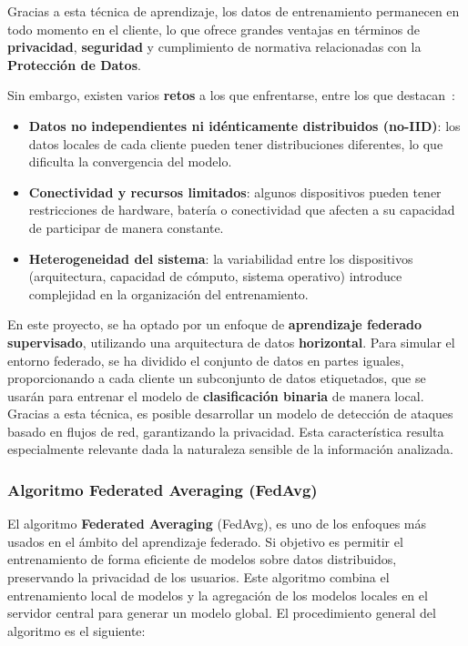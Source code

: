 
Gracias a esta técnica de aprendizaje, los datos de entrenamiento permanecen en todo momento en el cliente, lo que ofrece grandes ventajas en términos de \textbf{privacidad}, \textbf{seguridad} y cumplimiento de normativa relacionadas con la \textbf{Protección de Datos}.

Sin embargo, existen varios \textbf{retos} a los que enfrentarse, entre los que destacan~\cite{aprendizaje_federado_articulo}:

\begin{itemize}
    \item \textbf{Datos no independientes ni idénticamente distribuidos (no-IID)}: los datos locales de cada cliente pueden tener distribuciones diferentes, lo que dificulta la convergencia del modelo.
    
    \item \textbf{Conectividad y recursos limitados}: algunos dispositivos pueden tener restricciones de hardware, batería o conectividad que afecten a su capacidad de participar de manera constante.
    
    \item \textbf{Heterogeneidad del sistema}: la variabilidad entre los dispositivos (arquitectura, capacidad de cómputo, sistema operativo) introduce complejidad en la organización del entrenamiento.
\end{itemize}

En este proyecto, se ha optado por un enfoque de \textbf{aprendizaje federado supervisado}, utilizando una arquitectura de datos \textbf{horizontal}. Para simular el entorno federado, se ha dividido el conjunto de datos en partes iguales, proporcionando a cada cliente un subconjunto de datos etiquetados, que se usarán para entrenar el modelo de \textbf{clasificación binaria} de manera local. Gracias a esta técnica, es posible desarrollar un modelo de detección de ataques basado en flujos de red, garantizando la privacidad. Esta característica resulta especialmente relevante dada la naturaleza sensible de la información analizada.

\subsubsection{Algoritmo Federated Averaging (FedAvg)}
\label{subsubsec:FedAvg}
El algoritmo \textbf{Federated Averaging} (FedAvg), es uno de los enfoques más usados en el ámbito del aprendizaje federado. Si objetivo es permitir el entrenamiento de forma eficiente de modelos sobre datos distribuidos, preservando la privacidad de los usuarios. Este algoritmo combina el entrenamiento local de modelos y la agregación de los modelos locales en el servidor central para generar un modelo global. El procedimiento general del algoritmo es el siguiente:

